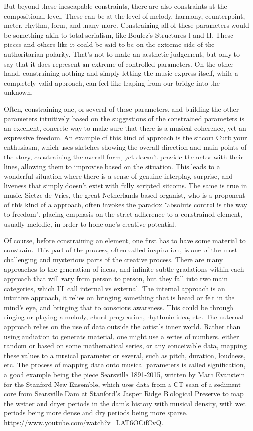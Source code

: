 \documentclass[12pt,twoside,maitrise]{dms_ks}
\theoremstyle{definition}
\begin{document}
But beyond these inescapable constraints, there are also constraints at the compositional level.
These can be at the level of melody, harmony, counterpoint, meter, rhythm, form, and many more.
Constraining all of these parameters would be something akin to total serialism, like Boulez's Structures I and II.
These pieces and others like it could be said to be on the extreme side of the authoritarian polarity.
That's not to make an aesthetic judgement, but only to say that it does represent an extreme of controlled parameters.
On the other hand, constraining nothing and simply letting the music express itself, while a completely valid approach, can feel like leaping from our bridge into the unknown.

Often, constraining one, or several of these parameters, and building the other parameters intuitively based on the suggestions of the constrained parameters is an excellent, concrete way to make sure that there is a musical coherence, yet an expressive freedom.
An example of this kind of approach is the sitcom Curb your enthusiasm, which uses sketches showing the overall direction and main points of the story, constraining the overall form, yet doesn't provide the actor with their lines, allowing them to improvise based on the situation.
This leads to a wonderful situation where there is a sense of genuine interplay, surprise, and liveness that simply doesn't exist with fully scripted sitcoms.
The same is true in music.
Sietze de Vries, the great Netherlands-based organist, who is a proponent of this kind of a approach, often invokes the paradox "absolute control is the way to freedom", placing emphasis on the strict adherence to a constrained element, usually melodic, in order to hone one's creative potential.

Of course, before constraining an element, one first has to have some material to constrain.
This part of the process, often called inspiration, is one of the most challenging and mysterious parts of the creative process.
There are many approaches to the generation of ideas, and infinite subtle gradations within each approach that will vary from person to person, but they fall into two main categories, which I’ll call internal vs external.
The internal approach is an intuitive approach, it relies on bringing something that is heard or felt in the mind’s eye, and bringing that to conscious awareness.
This could be through singing or playing a melody, chord progression, rhythmic idea, etc.
The external approach relies on the use of data outside the artist’s inner world.
Rather than using audiation to generate material, one might use a series of numbers, either random or based on some mathematical series, or any conceivable data, mapping these values to a musical parameter or several, such as pitch, duration, loudness, etc.
The process of mapping data onto musical parameters is called signification, a good example being the piece Searsville 1891-2015, written by Marc Evanstein for the Stanford New Ensemble, which uses data from a CT scan of a sediment core from Searsville Dam at Stanford's Jasper Ridge Biological Preserve to map the wetter and dryer periods in the dam’s history with musical density, with wet periods being more dense and dry periods being more sparse.
https://www.youtube.com/watch?v=LAT6OCifCvQ.
\end{document}
